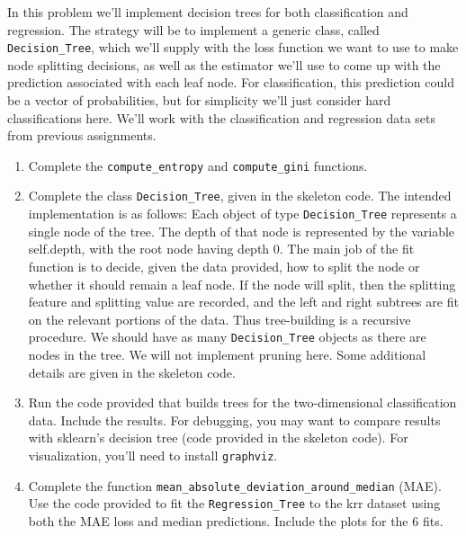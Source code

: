 \documentclass{article}
\theoremstyle{plain}
\theoremstyle{definition}
\begin{document}
In this problem we'll implement decision trees for both classification
and regression. The strategy will be to implement a generic class,
called \texttt{Decision\_Tree}, which we'll supply with the loss function
we want to use to make node splitting decisions, as well as the estimator
we'll use to come up with the prediction associated with each leaf
node. For classification, this prediction could be a vector of probabilities,
but for simplicity we'll just consider hard classifications here.
We'll work with the classification and regression data sets from previous
assignments.
\begin{enumerate}
\setcounter{enumi}{\value{saveenum}}
\item Complete the \texttt{compute\_entropy} and \texttt{compute\_gini}
functions.\\


\item Complete the class \texttt{Decision\_Tree}, given in
the skeleton code. The intended implementation is as follows: Each
object of type \texttt{Decision\_Tree} represents a single node of
the tree. The depth of that node is represented by the variable self.depth,
with the root node having depth 0. The main job of the fit function
is to decide, given the data provided, how to split the node or whether
it should remain a leaf node. If the node will split, then the splitting
feature and splitting value are recorded, and the left and right subtrees
are fit on the relevant portions of the data. Thus tree-building is
a recursive procedure. We should have as many \texttt{Decision\_Tree}
objects as there are nodes in the tree. We will not implement pruning\textbf{
}here. Some additional details are given in the skeleton code.\\


\item Run the code provided that builds trees for the two-dimensional
classification data. Include the results. For debugging, you may want
to compare results with sklearn's decision tree (code provided in the skeleton code). For visualization,
you'll need to install \texttt{graphviz}.\\

\item  Complete the function \texttt{mean\_absolute\_deviation\_around\_median}
(MAE). Use the code provided to fit the \texttt{Regression\_Tree} to
the krr dataset using both the MAE loss and median predictions. Include
the plots for the 6 fits.\\

\setcounter{saveenum}{\value{enumi}}
\end{enumerate}
\end{document}
